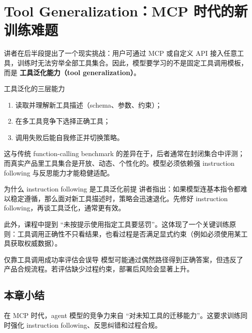 \section{Tool Generalization：MCP 时代的新训练难题}

讲者在后半段提出了一个现实挑战：用户可通过 MCP 或自定义 API 接入任意工具，训练时无法穷举全部工具集合。因此，模型要学习的不是固定工具调用模板，而是 \textbf{工具泛化能力（tool generalization）}。

\begin{knowledgebox}{工具泛化的三层能力}
\begin{enumerate}
    \item 读取并理解新工具描述（schema、参数、约束）；
    \item 在多工具竞争下选择正确工具；
    \item 调用失败后能自我修正并切换策略。
\end{enumerate}
\end{knowledgebox}

这与传统 function-calling benchmark 的差异在于，后者通常在封闭集合中评测；而真实产品里工具集合是开放、动态、个性化的。模型必须依赖强 instruction following 与反思能力才能稳健适配。

\begin{importantbox}{为什么 instruction following 是工具泛化前提}
讲者指出：如果模型连基本指令都难以稳定遵循，那么面对新工具描述时，策略会迅速退化。先修好 instruction following，再谈工具泛化，通常更有效。
\end{importantbox}

此外，课程中提到 ``未按提示使用指定工具要惩罚''。这体现了一个关键训练原则：工具调用正确性不只看结果，也看过程是否满足显式约束（例如必须使用某工具获取权威数据）。

\begin{warningbox}{仅靠工具调用成功率评估会误导}
模型可能通过偶然路径得到正确答案，但违反了产品合规流程。若评估缺少过程约束，部署后风险会显著上升。
\end{warningbox}

\subsection{本章小结}
在 MCP 时代，agent 模型的竞争力来自 ``对未知工具的迁移能力''。这要求训练同时强化 instruction following、反思纠错和过程合规。

